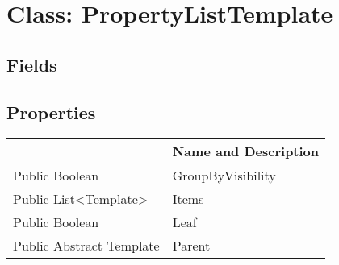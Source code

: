 \documentclass[11pt, oneside, a4paper]{book}
\begin{document}
\hypertarget{SoftwareEngineeringTools.{}Documentation.{}PropertyListTemplate}{}
\section{Class: PropertyListTemplate}

\subsection{Fields}

\subsection{Properties}
\begin{center}
\begin{tabular}{| p{3cm} | p{12cm} | }
\hline
\textbf{ } & \textbf{ Name and Description}\\
\hline
 Public  Boolean &  GroupByVisibility\hypertarget{SoftwareEngineeringTools.{}Documentation.{}PropertyListTemplate.{}GroupByVisibility}{}\\
\hline
 Public  List<Template> &  Items\hypertarget{SoftwareEngineeringTools.{}Documentation.{}PropertyListTemplate.{}Items}{}\\
\hline
 Public  Boolean &  Leaf\hypertarget{SoftwareEngineeringTools.{}Documentation.{}PropertyListTemplate.{}Leaf}{}\\
\hline
 Public  Abstract  Template &  Parent\hypertarget{SoftwareEngineeringTools.{}Documentation.{}PropertyListTemplate.{}Parent}{}\\
\hline
\end{tabular}
\end{center}
\end{document}
